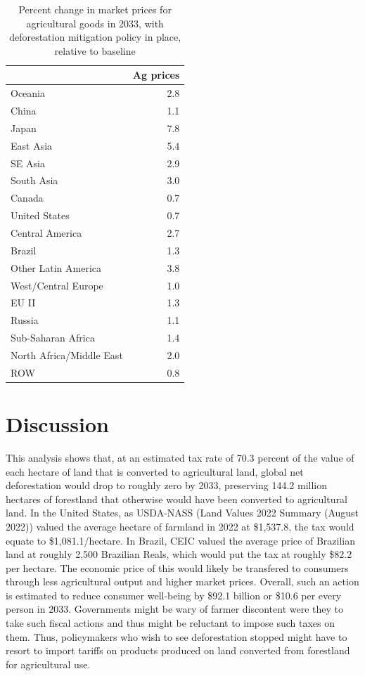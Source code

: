 \documentclass[
]{article}
\begin{document}
\begin{table}
\centering
\caption{\label{tab:pm}Percent change in market prices for agricultural goods in 2033, with deforestation mitigation policy in place, relative to baseline}
\centering
\begin{tabular}[t]{|>{}l|>{}r|}
\hline
  & Ag prices\\
\hline
Oceania & 2.8\\
\hline
China & 1.1\\
\hline
Japan & 7.8\\
\hline
East Asia & 5.4\\
\hline
SE Asia & 2.9\\
\hline
South Asia & 3.0\\
\hline
Canada & 0.7\\
\hline
United States & 0.7\\
\hline
Central America & 2.7\\
\hline
Brazil & 1.3\\
\hline
Other Latin America & 3.8\\
\hline
West/Central Europe & 1.0\\
\hline
EU II & 1.3\\
\hline
Russia & 1.1\\
\hline
Sub-Saharan Africa & 1.4\\
\hline
North Africa/Middle East & 2.0\\
\hline
ROW & 0.8\\
\hline
\end{tabular}
\end{table}

\hypertarget{discussion}{%
\section{Discussion}\label{discussion}}

This analysis shows that, at an estimated tax rate of 70.3 percent of the value of each hectare of land that is converted to agricultural land, global net deforestation would drop to roughly zero by 2033, preserving 144.2 million hectares of forestland that otherwise would have been converted to agricultural land. In the United States, as USDA-NASS (Land Values 2022 Summary (August 2022)) valued the average hectare of farmland in 2022 at \$1,537.8, the tax would equate to \$1,081.1/hectare. In Brazil, CEIC valued the average price of Brazilian land at roughly 2,500 Brazilian Reals, which would put the tax at roughly \$82.2 per hectare. The economic price of this would likely be transfered to consumers through less agricultural output and higher market prices. Overall, such an action is estimated to reduce consumer well-being by \$92.1 billion or \$10.6 per every person in 2033. Governments might be wary of farmer discontent were they to take such fiscal actions and thus might be reluctant to impose such taxes on them. Thus, policymakers who wish to see deforestation stopped might have to resort to import tariffs on products produced on land converted from forestland for agricultural use.
\end{document}
